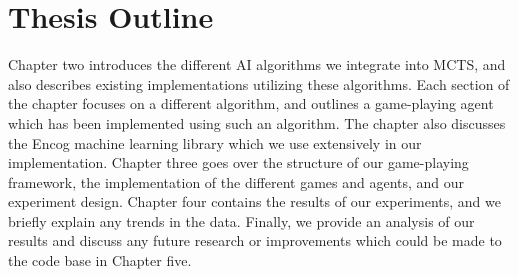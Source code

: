 \section{Thesis Outline}\label{sec:outline}
Chapter two introduces the different AI algorithms we integrate into MCTS, and also describes existing implementations utilizing these algorithms.  Each section of the chapter focuses on a different algorithm, and outlines a game-playing agent which has been implemented using such an algorithm.  The chapter also discusses the Encog machine learning library which we use extensively in our implementation.  Chapter three goes over the structure of our game-playing framework, the implementation of the different games and agents, and our experiment design.  Chapter four contains the results of our experiments, and we briefly explain any trends in the data.  Finally, we provide an analysis of our results and discuss any future research or improvements which could be made to the code base in Chapter five.
